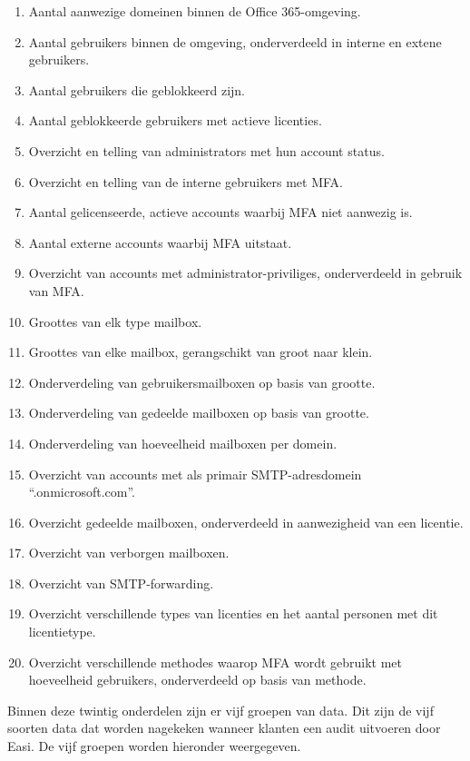 \begin{enumerate}
    \item Aantal aanwezige domeinen binnen de Office 365-omgeving.
    \item Aantal gebruikers binnen de omgeving, onderverdeeld in interne
    en extene gebruikers.
    \item Aantal gebruikers die geblokkeerd zijn.
    \item Aantal geblokkeerde gebruikers met actieve licenties.
    \item Overzicht en telling van administrators met hun account status.
    \item Overzicht en telling van de interne gebruikers met \ac{MFA}.
    \item Aantal gelicenseerde, actieve accounts waarbij \ac{MFA} niet aanwezig is.
    \item Aantal externe accounts waarbij \ac{MFA} uitstaat.
    \item Overzicht van accounts met administrator-priviliges,
    onderverdeeld in gebruik van \ac{MFA}.
    \item Groottes van elk type mailbox.
    \item Groottes van elke mailbox, gerangschikt van groot naar klein.
    \item Onderverdeling van gebruikersmailboxen op basis van grootte.
    \item Onderverdeling van gedeelde mailboxen op basis van grootte.
    \item Onderverdeling van hoeveelheid mailboxen per domein.
    \item Overzicht van accounts met als primair \Ac{SMTP}-adresdomein “.onmicrosoft.com”.
    \item Overzicht gedeelde mailboxen, onderverdeeld in aanwezigheid van een licentie.
    \item Overzicht van verborgen mailboxen.
    \item Overzicht van \ac{SMTP}-forwarding.
    \item Overzicht verschillende types van licenties en het aantal personen met dit licentietype.
    \item Overzicht verschillende methodes waarop \ac{MFA} wordt gebruikt met hoeveelheid gebruikers, onderverdeeld op basis van methode.
\end{enumerate}

Binnen deze twintig onderdelen zijn er vijf groepen van data. Dit zijn de vijf soorten data dat worden nagekeken wanneer klanten een audit uitvoeren door Easi. De vijf groepen worden hieronder weergegeven. 

